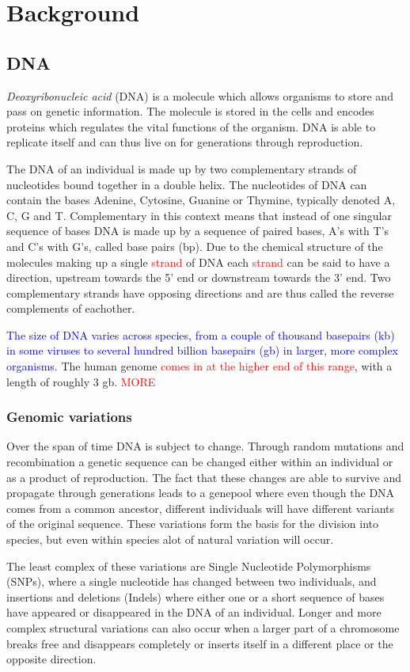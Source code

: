 \documentclass[thesis.tex]{subfiles}
\begin{document}
\chapter{Background}
\section{DNA}
\textit{Deoxyribonucleic acid} (DNA) is a molecule which allows organisms to store and pass on genetic information. The molecule is stored in the cells and encodes proteins which regulates the vital functions of the organism. DNA is able to replicate itself and can thus live on for generations through reproduction.\\
\par\noindent
The DNA of an individual is made up by two complementary strands of nucleotides bound together in a double helix. The nucleotides of DNA can contain the bases Adenine, Cytosine, Guanine or Thymine, typically denoted A, C, G and T. Complementary in this context means that instead of one singular sequence of bases DNA is made up by a sequence of paired bases, A's with T's and C's with G's, called base pairs (bp). Due to the chemical structure of the molecules making up a single \textcolor{red}{strand} of DNA each \textcolor{red}{strand} can be said to have a direction, upstream towards the 5' end or downstream towards the 3' end. Two complementary strands have opposing directions and are thus called the reverse complements of eachother.\\
\par\noindent
\textcolor{blue}{The size of DNA varies across species, from a couple of thousand basepairs (kb) in some viruses to several hundred billion basepairs (gb) in larger, more complex organisms}\cite{Citation needed?}. The human genome \textcolor{red}{comes in at the higher end of this range}, with a length of roughly 3 gb. \textcolor{red}{MORE}
\subsection{Genomic variations}
Over the span of time DNA is subject to change. Through random mutations and recombination a genetic sequence can be changed either within an individual or as a product of reproduction. The fact that these changes are able to survive and propagate through generations leads to a genepool where even though the DNA comes from a common ancestor, different individuals will have different variants of the original sequence. These variations form the basis for the division into species, but even within species alot of natural variation will occur.\\
\par\noindent
The least complex of these variations are Single Nucleotide Polymorphisms (SNPs), where a single nucleotide has changed between two individuals, and insertions and deletions (Indels) where either one or a short sequence of bases have appeared or disappeared in the DNA of an individual. Longer and more complex structural variations can also occur when a larger part of a chromosome breaks free and disappears completely or inserts itself in a different place or the opposite direction. 
\end{document}
